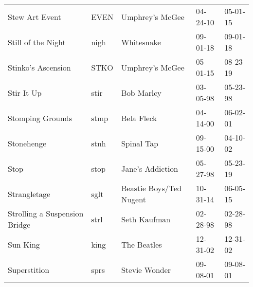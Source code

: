 \begin{longtable}{p{}p{}p{}p{}p{}}
                                                          Stew Art Event &          EVEN &                                          Umphrey's McGee &              04-24-10 &             05-01-15 \\
                                                      Still of the Night &          nigh &                                               Whitesnake &              09-01-18 &             09-01-18 \\
                                                      Stinko's Ascension &          STKO &                                          Umphrey's McGee &              05-01-15 &             08-23-19 \\
                                                              Stir It Up &          stir &                                               Bob Marley &              03-05-98 &             05-23-98 \\
                                                        Stomping Grounds &          stmp &                                               Bela Fleck &              04-14-00 &             06-02-01 \\
                                                              Stonehenge &          stnh &                                               Spinal Tap &              09-15-00 &             04-10-02 \\
                                                                    Stop &          stop &                                         Jane's Addiction &              05-27-98 &             05-23-19 \\
                                                            Strangletage &          sglt &                                  Beastie Boys/Ted Nugent &              10-31-14 &             06-05-15 \\
                                           Strolling a Suspension Bridge &          strl &                                             Seth Kaufman &              02-28-98 &             02-28-98 \\
                                                                Sun King &          king &                                              The Beatles &              12-31-02 &             12-31-02 \\
                                                            Superstition &          sprs &                                            Stevie Wonder &              09-08-01 &             09-08-01 \\

\end{longtable}

